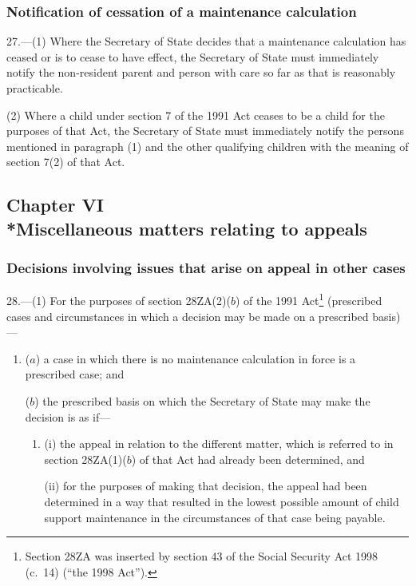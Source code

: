 \documentclass[12pt,a4paper]{article}
\begin{document}
\subsubsection[27. Notification of cessation of a maintenance calculation]{Notification of cessation of a maintenance calculation}

27.---(1)  Where the Secretary of State decides that a maintenance calculation has ceased or is to cease to have effect, the Secretary of State must immediately notify the non-resident parent and person with care so far as that is reasonably practicable.

(2) Where a child under section 7 of the 1991 Act ceases to be a child for the purposes of that Act, the Secretary of State must immediately notify the persons mentioned in paragraph (1) and the other qualifying children with the meaning of section 7(2) of that Act.

\subsection[Chapter VI --- Miscellaneous matters relating to appeals]{Chapter VI\\*Miscellaneous matters relating to appeals}

\renewcommand\parthead{--- Part III Chapter VI}

\subsubsection[28. Decisions involving issues that arise on appeal in other cases]{Decisions involving issues that arise on appeal in other cases}

28.---(1)  For the purposes of section 28ZA(2)($b$)  of the 1991 Act\footnote{Section 28ZA was inserted by section 43 of the Social Security Act 1998 (c.~14) (“the 1998 Act”).} (prescribed cases and circumstances in which a decision may be made on a prescribed basis)—
\begin{enumerate}\item[]
($a$) a case in which there is no maintenance calculation in force is a prescribed case; and

($b$) the prescribed basis on which the Secretary of State may make the decision is as if—
\begin{enumerate}\item[]
(i) the appeal in relation to the different matter, which is referred to in section 28ZA(1)($b$)  of that Act had already been determined, and

(ii) for the purposes of making that decision, the appeal had been determined in a way that resulted in the lowest possible amount of child support maintenance in the circumstances of that case being payable.
\end{enumerate}
\end{enumerate}
\end{document}

